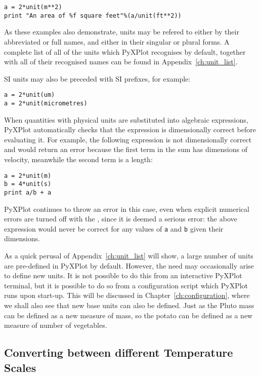 \begin{verbatim}
a = 2*unit(m**2)
print "An area of %f square feet"%(a/unit(ft**2))
\end{verbatim}

\noindent As these examples also demonstrate, units may be refered to either by
their abbreviated or full names, and either in their singular or plural forms.
A complete list of all of the units which PyXPlot recognises by default,
together with all of their recognised names can be found in
Appendix~\ref{ch:unit_list}.

SI units may also be preceded with SI prefixes, for
example:

\begin{verbatim}
a = 2*unit(um)
a = 2*unit(micrometres)
\end{verbatim}

When quantities with physical units are substituted into algebraic expressions,
PyXPlot automatically checks that the expression is dimensionally correct
before evaluating it. For example, the following expression is not
dimensionally correct and would return an error because the first term in the
sum has dimensions of velocity, meanwhile the second term is a length:

\begin{verbatim}
a = 2*unit(m)
b = 4*unit(s)
print a/b + a
\end{verbatim}

\noindent PyXPlot continues to throw an error in this case, even when explicit
numerical errors are turned off with the ,
since it is deemed a serious error: the above expression would never be correct
for any values of {\tt a} and {\tt b} given their dimensions.

As a quick perusal of Appendix~\ref{ch:unit_list} will show, a large number of
units are pre-defined in PyXPlot by default. However, the need may occasionally
arise to define new units. It is not possible to do this from an interactive
PyXPlot terminal, but it is possible to do so from a configuration script which
PyXPlot runs upon start-up. This will be discussed in
Chapter~\ref{ch:configuration}, where we shall also see that new base units can
also be defined. Just as the Pluto mass can be defined as a new measure of
mass, so the potato can be defined as a new measure of number of vegetables.

\subsection{Converting between different Temperature Scales}

